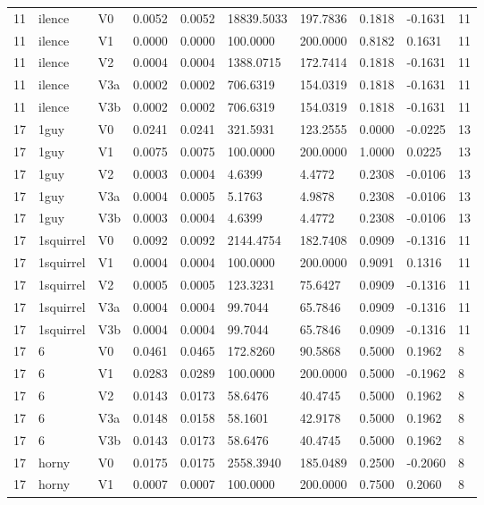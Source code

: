 \begin{table}[htbp]
\begin{tabular}{llllllllll}
11 & ilence & V0 & 0.0052 & 0.0052 & 18839.5033 & 197.7836 & 0.1818 & -0.1631 & 11 \\
11 & ilence & V1 & 0.0000 & 0.0000 & 100.0000 & 200.0000 & 0.8182 & 0.1631 & 11 \\
11 & ilence & V2 & 0.0004 & 0.0004 & 1388.0715 & 172.7414 & 0.1818 & -0.1631 & 11 \\
11 & ilence & V3a & 0.0002 & 0.0002 & 706.6319 & 154.0319 & 0.1818 & -0.1631 & 11 \\
11 & ilence & V3b & 0.0002 & 0.0002 & 706.6319 & 154.0319 & 0.1818 & -0.1631 & 11 \\
17 & 1guy & V0 & 0.0241 & 0.0241 & 321.5931 & 123.2555 & 0.0000 & -0.0225 & 13 \\
17 & 1guy & V1 & 0.0075 & 0.0075 & 100.0000 & 200.0000 & 1.0000 & 0.0225 & 13 \\
17 & 1guy & V2 & 0.0003 & 0.0004 & 4.6399 & 4.4772 & 0.2308 & -0.0106 & 13 \\
17 & 1guy & V3a & 0.0004 & 0.0005 & 5.1763 & 4.9878 & 0.2308 & -0.0106 & 13 \\
17 & 1guy & V3b & 0.0003 & 0.0004 & 4.6399 & 4.4772 & 0.2308 & -0.0106 & 13 \\
17 & 1squirrel & V0 & 0.0092 & 0.0092 & 2144.4754 & 182.7408 & 0.0909 & -0.1316 & 11 \\
17 & 1squirrel & V1 & 0.0004 & 0.0004 & 100.0000 & 200.0000 & 0.9091 & 0.1316 & 11 \\
17 & 1squirrel & V2 & 0.0005 & 0.0005 & 123.3231 & 75.6427 & 0.0909 & -0.1316 & 11 \\
17 & 1squirrel & V3a & 0.0004 & 0.0004 & 99.7044 & 65.7846 & 0.0909 & -0.1316 & 11 \\
17 & 1squirrel & V3b & 0.0004 & 0.0004 & 99.7044 & 65.7846 & 0.0909 & -0.1316 & 11 \\
17 & 6 & V0 & 0.0461 & 0.0465 & 172.8260 & 90.5868 & 0.5000 & 0.1962 & 8 \\
17 & 6 & V1 & 0.0283 & 0.0289 & 100.0000 & 200.0000 & 0.5000 & -0.1962 & 8 \\
17 & 6 & V2 & 0.0143 & 0.0173 & 58.6476 & 40.4745 & 0.5000 & 0.1962 & 8 \\
17 & 6 & V3a & 0.0148 & 0.0158 & 58.1601 & 42.9178 & 0.5000 & 0.1962 & 8 \\
17 & 6 & V3b & 0.0143 & 0.0173 & 58.6476 & 40.4745 & 0.5000 & 0.1962 & 8 \\
17 & horny & V0 & 0.0175 & 0.0175 & 2558.3940 & 185.0489 & 0.2500 & -0.2060 & 8 \\
17 & horny & V1 & 0.0007 & 0.0007 & 100.0000 & 200.0000 & 0.7500 & 0.2060 & 8 \\

\end{tabular}
\end{table}
